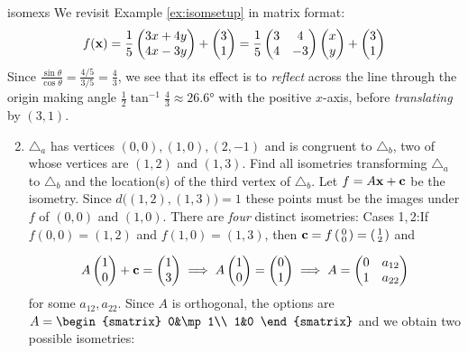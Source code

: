 \begin{examples}{}{isomexs}
	\exstart We revisit Example \ref{ex:isomsetup} in matrix format:
	\[
		f({\mathbf{x}})=\frac 15\begin{pmatrix}3x+4y\\4x-3y\end{pmatrix}+\begin{pmatrix}3\\1\end{pmatrix} =\frac 15
		\begin{pmatrix}
			3&4\\
			4&-3
		\end{pmatrix}
		\begin{pmatrix}x\\y\end{pmatrix}+\begin{pmatrix}3\\1\end{pmatrix}
	\]
	Since $\frac{\sin\theta}{\cos\theta}=\frac{4/5}{3/5}=\frac 43$, we see that its effect is to \emph{reflect} across the line through the origin making angle $\frac 12\tan^{-1}\frac 43\approx \ang{26.6}$ with the positive $x$-axis, before \emph{translating} by $(3,1)$.
	
	\begin{enumerate}\setcounter{enumi}{1}
		\item\label{ex:isomexs2} $\triangle_a$ has vertices $(0,0),(1,0),(2,-1)$ and is congruent to $\triangle_b$, two of whose vertices are $(1,2)$ and $(1,3)$. Find all isometries transforming $\triangle_a$ to $\triangle_b$ and the location(s) of the third vertex of $\triangle_b$.\smallbreak
	Let $f=A\vx+\vc$ be the isometry. Since $d\bigl((1,2),(1,3)\bigr)=1$ these points must be the images under $f$ of $(0,0)$ and $(1,0)$. There are \emph{four} distinct isometries:
	\smallbreak
	Cases 1,\,2:\lstsp If $f(0,0)=(1,2)$ and $f(1,0)=(1,3)$, then $\vc=f\stwovec 00=\stwovec 12$ and\par
	\begin{minipage}[t]{0.76\linewidth}\vspace{-10pt}
	  \begin{gather*}
	  	A\begin{pmatrix}1\\0\end{pmatrix}+{\mathbf{c}}=\begin{pmatrix}1\\3\end{pmatrix}\implies A\begin{pmatrix}1\\0\end{pmatrix}=\begin{pmatrix}0\\1\end{pmatrix}   \implies A=
	  	\begin{pmatrix}
	 		0&a_{12}\\
	  	1&a_{22}
	  	\end{pmatrix}
	  \end{gather*}
	  for some $a_{12},a_{22}$. Since $A$ is orthogonal, the options are $A=
	  \begin{smatrix}
	  	0&\mp 1\\
	  	1&0
	  \end{smatrix}$
	  and we obtain two possible isometries:
	  \begin{itemize}
	    \item $\textcolor{blue}{f_1(\vx)=
	    \begin{smatrix}
	  		0&-1\\
	  		1&0
	    \end{smatrix}
}
\end{itemize}
\end{minipage}
\end{enumerate}
\end{examples}
